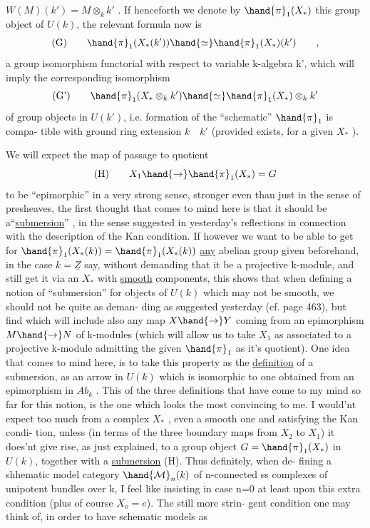 
$W(M)(k') = M\otimes_k k'$ . If henceforth we denote by $\hand{\pi}_1(X_*)$ this group
object of $U(k)$, the relevant formula now is
\[ \text{(G)} \qquad \hand{\pi}_1(X_*(k'))\hand{\simeq} \hand{\pi}_1(X_*)(k') \qquad , \]
a group isomorphism functorial with respect to variable k-algebra k',
which will imply the corresponding isomorphism
\[ \text{(G')} \qquad \hand{\pi}_1(X_*\otimes_k k')\hand{\simeq} \hand{\pi}_1(X_*)\otimes_k k' \]
of group objects in $U(k')$, i.e. formation of the ``schematic'' $\hand{\pi}_1$ is compa-%
tible with ground ring extension $k \quad k'$ (provided  exists, for a given
$X_*$ ).

We will expect  the map of passage to quotient
\[ \text{(H)} \qquad X_1\hand{\to}\hand{\pi}_1(X_*) = G \]
to be ``epimorphic'' in a very strong sense, stronger even than just in
the sense of presheaves, the first thought that comes to mind here is
that it should be a``\uline{submersion}'' , in the sense suggested in yesterday's
reflections in connection with the description of the Kan condition. If
however we want to be able to get for $\hand{\pi}_1(X_*(k)) = \hand{\pi}_1(X_*(k))$ \uline{any} abelian
group given beforehand, in the case $k=\underline{Z}$ say, without demanding that it
be a projective k-module, and still get it via an $X_*$ with \uline{smooth}
components, this shows that when defining a notion of ``submersion'' for
objects of $U(k)$ which may not be smooth, we should not be quite as deman-%
ding  as suggested yesterday (cf. page 463), but find
  which will include also any map $X \hand{\to} Y$ coming from an epimorphism
$M\hand{\to} N$ of k-modules (which will allow us to take $X_1$ as associated to
a projective k-module admitting the given $\hand{\pi}_1$ as it's quotient). One
idea that comes to mind here, is to take this property as the \uline{definition}
of a submersion, as an arrow in $U(k)$ which  is isomorphic to
one obtained from an epimorphism in $Ab_k$ . This\hand{,}  of the
three definitions that have come to my mind so far for this notion, is
the one which looks the most convincing to me. I would'nt expect too
much from a complex $X_*$ , even a smooth one and satisfying the Kan condi-%
tion, unless (in terms of the three boundary maps from $X_2$ to $X_1$) it
does'nt give rise, as just explained, to a group object $G = \hand{\pi}_1(X_*)$
in $U(k)$, together with a \uline{submersion} (H). Thus definitely, when de-%
fining a shhematic model category $\hand{\mathcal{M}}_n(k)$ of n-connected ss complexes
of unipotent bundles over k, I feel like insisting in case n=0 at least
upon this extra condition (plus of course $X_o = e$). The still more strin-%
gent condition one may think of, in order to have schematic models as


